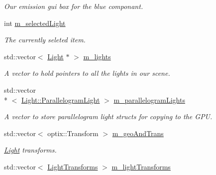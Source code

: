 \begin{DoxyCompactItemize}
\begin{DoxyCompactList}\small\item\em Our emission gui box for the blue componant. \end{DoxyCompactList}\item 
\hypertarget{class_light_manager_ae63de2268878a6e0c1cec5e8cf281fe9}{int \hyperlink{class_light_manager_ae63de2268878a6e0c1cec5e8cf281fe9}{m\-\_\-selected\-Light}}\label{class_light_manager_ae63de2268878a6e0c1cec5e8cf281fe9}

\begin{DoxyCompactList}\small\item\em The currently seleted item. \end{DoxyCompactList}\item 
\hypertarget{class_light_manager_a2bb4b0ed1b75099da9182be3dcb057f0}{std\-::vector$<$ \hyperlink{class_light}{Light} $\ast$ $>$ \hyperlink{class_light_manager_a2bb4b0ed1b75099da9182be3dcb057f0}{m\-\_\-lights}}\label{class_light_manager_a2bb4b0ed1b75099da9182be3dcb057f0}

\begin{DoxyCompactList}\small\item\em A vector to hold pointers to all the lights in our scene. \end{DoxyCompactList}\item 
\hypertarget{class_light_manager_a83fbf9d166e1b56d596be89bfe49df6e}{std\-::vector\\*
$<$ \hyperlink{struct_light_1_1_parallelogram_light}{Light\-::\-Parallelogram\-Light} $>$ \hyperlink{class_light_manager_a83fbf9d166e1b56d596be89bfe49df6e}{m\-\_\-parallelogram\-Lights}}\label{class_light_manager_a83fbf9d166e1b56d596be89bfe49df6e}

\begin{DoxyCompactList}\small\item\em A vector to store parallelogram light structs for copying to the G\-P\-U. \end{DoxyCompactList}\item 
\hypertarget{class_light_manager_ae36c82ae88082c679818f7259ef4fde3}{std\-::vector$<$ optix\-::\-Transform $>$ \hyperlink{class_light_manager_ae36c82ae88082c679818f7259ef4fde3}{m\-\_\-geo\-And\-Trans}}\label{class_light_manager_ae36c82ae88082c679818f7259ef4fde3}

\begin{DoxyCompactList}\small\item\em \hyperlink{class_light}{Light} transforms. \end{DoxyCompactList}\item 
\hypertarget{class_light_manager_a01dabdbdcfd9b2a6d6a87e0ab15a1f59}{std\-::vector$<$ \hyperlink{struct_light_manager_1_1_light_transforms}{Light\-Transforms} $>$ \hyperlink{class_light_manager_a01dabdbdcfd9b2a6d6a87e0ab15a1f59}{m\-\_\-light\-Transforms}}\label{class_light_manager_a01dabdbdcfd9b2a6d6a87e0ab15a1f59}


\end{DoxyCompactItemize}

